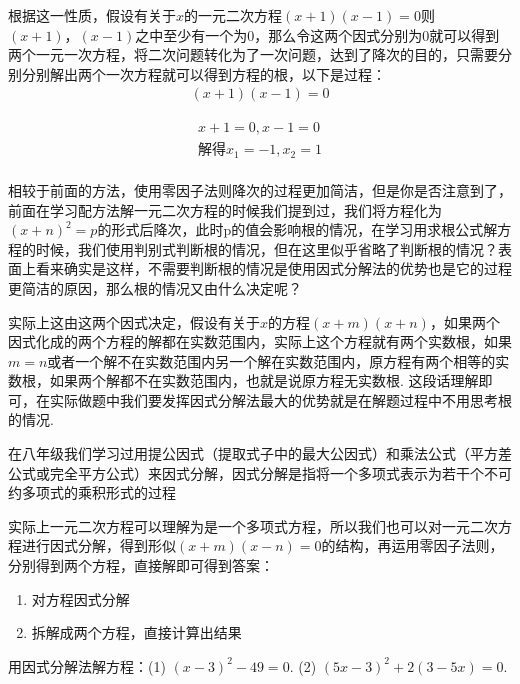 \documentclass[lang=cn, 10pt, titlestyle=hang, oneside]{elegantbook}
\begin{document}
根据这一性质，假设有关于\(x\)的一元二次方程\((x+1)(x-1)=0\)则\((x+1)，(x-1)\)之中至少有一个为0，那么令这两个因式分别为0就可以得到两个一元一次方程，将二次问题转化为了一次问题，达到了降次的目的，只需要分别分别解出两个一次方程就可以得到方程的根，以下是过程：
\begin{align*}
    (x+1)(x-1)=0
\end{align*}
\begin{solution}
    \begin{align*}
        x+1=0, x-1=0\\
        解得x_1=-1,x_2=1\\
    \end{align*}
\end{solution}
相较于前面的方法，使用零因子法则降次的过程更加简洁，但是你是否注意到了，前面在学习配方法解一元二次方程的时候我们提到过，我们将方程化为\((x+n)^2=p\)的形式后降次，此时p的值会影响根的情况，在学习用求根公式解方程的时候，我们使用判别式判断根的情况，但在这里似乎省略了判断根的情况？表面上看来确实是这样，不需要判断根的情况是使用因式分解法的优势也是它的过程更简洁的原因，那么根的情况又由什么决定呢？
\par
实际上这由这两个因式决定，假设有关于\(x\)的方程\((x+m)(x+n)\)，如果两个因式化成的两个方程的解都在实数范围内，实际上这个方程就有两个实数根，如果\(m=n\)或者一个解不在实数范围内另一个解在实数范围内，原方程有两个相等的实数根，如果两个解都不在实数范围内，也就是说原方程无实数根. 这段话理解即可，在实际做题中我们要发挥因式分解法最大的优势就是在解题过程中不用思考根的情况.

在八年级我们学习过用提公因式（提取式子中的最大公因式）和乘法公式（平方差公式或完全平方公式）来因式分解，因式分解是指将一个多项式表示为若干个不可约多项式的乘积形式的过程
\par
实际上一元二次方程可以理解为是一个多项式方程，所以我们也可以对一元二次方程进行因式分解，得到形似\((x+m)(x-n)=0\)的结构，再运用零因子法则，分别得到两个方程，直接解即可得到答案：

\begin{enumerate}
    \item 对方程因式分解
    \item 拆解成两个方程，直接计算出结果
\end{enumerate}



\begin{example}
    用因式分解法解方程：(1) \((x-3)^2-49=0\). (2) \((5x-3)^2+2(3-5x)=0\).
\end{example}
\end{document}
